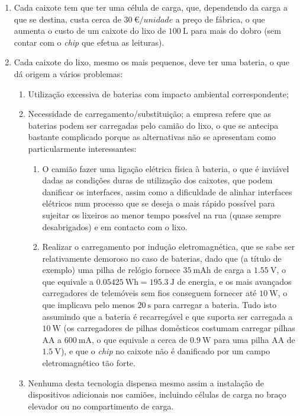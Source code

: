 \documentclass[11pt, a4paper, oneside]{book}
\begin{document}
\begin{enumerate}
    \item Cada caixote tem que ter uma célula de carga, que, dependendo da carga a que se destina, custa cerca de $\SI{30}{\euro/unidade}$ a preço de fábrica, o que aumenta o custo de um caixote do lixo de $\SI{100}{\liter}$ para mais do dobro (sem contar com o \textit{chip} que efetua as leituras).
    \item Cada caixote do lixo, mesmo os mais pequenos, deve ter uma bateria, o que dá origem a vários problemas:
    \begin{enumerate}
        \item Utilização excessiva de baterias com impacto ambiental correspondente;
        \item Necessidade de carregamento/substituição; a empresa refere que as baterias podem ser carregadas pelo camião do lixo, o que se antecipa bastante complicado porque as alternativas não se apresentam como particularmente interessantes:
        \begin{enumerate}
            \item O camião fazer uma ligação elétrica física à bateria, o que é inviável dadas as condições duras de utilização dos caixotes, que podem danificar os interfaces, assim como a dificuldade de alinhar interfaces elétricos num processo que se deseja o mais rápido possível para sujeitar os lixeiros ao menor tempo possível na rua (quase sempre desabrigados) e em contacto com o lixo. 
            \item Realizar o carregamento por indução eletromagnética, que se sabe ser relativamente demoroso no caso de baterias, dado que (a título de exemplo) uma pilha de relógio fornece $\SI{35}{\milli \ampere \hour}$ de carga a $\SI{1.55}{\volt}$, o que equivale a $\SI{0.05425}{\watt \hour} = \SI{195.3}{\joule}$ de energia, e os mais avançados carregadores de telemóveis sem fios conseguem fornecer até $\SI{10}{\watt}$, o que implicava pelo menos $\SI{20}{\second}$ para carregar a bateria. Tudo isto assumindo que a bateria é recarregável e que suporta ser carregada a $\SI{10}{\watt}$ (os carregadores de pilhas domésticos costumam carregar pilhas AA a $\SI{600}{\milli \ampere}$, o que equivale a cerca de $\SI{0.9}{\watt}$ para uma pilha AA de $\SI{1.5}{\volt}$), e que o \textit{chip} no caixote não é danificado por um campo eletromagnético tão forte.
        \end{enumerate}
    \item Nenhuma desta tecnologia dispensa mesmo assim a instalação de dispositivos adicionais nos camiões, incluindo células de carga no braço elevador ou no compartimento de carga.
    \end{enumerate}
\end{enumerate}
\end{document}
